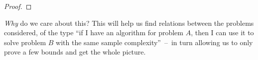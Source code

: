\documentclass[10pt]{article}
\newcommand{\p}{\mathbf{p}}
\newcommand{\q}{\mathbf{q}}
\theoremstyle{plain}
\begin{document}
\begin{proof}
\end{proof}
\emph{Why} do we care about this? This will help us find relations between the problems considered, of the type ``if I have an algorithm for problem $A$, then I can use it to solve problem $B$ with the same sample complexity''~--~in turn allowing us to only prove a few bounds and get the whole picture. 

\end{document}
